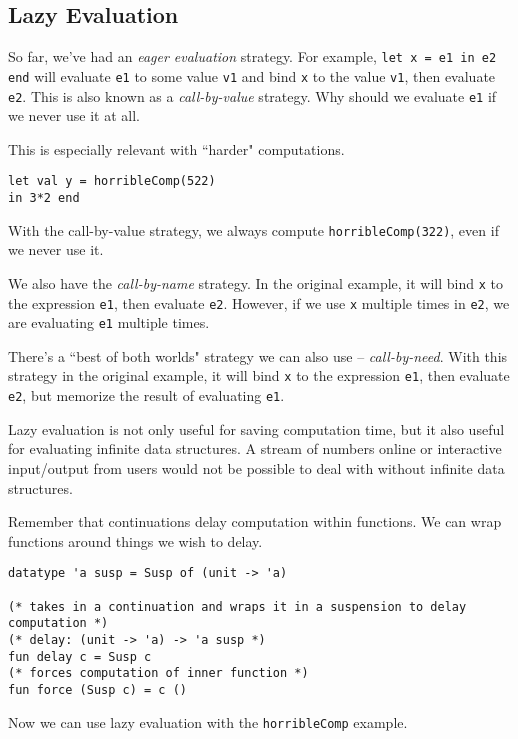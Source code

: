 \documentclass[11pt]{article}
\begin{document}
\subsection{Lazy Evaluation}

So far, we've had an \emph{eager evaluation} strategy. For example, \verb~let x = e1 in e2 end~ will evaluate \verb~e1~ to some value \verb~v1~ and bind \verb~x~ to the value \verb~v1~, then evaluate \verb~e2~. This is also known as a \emph{call-by-value} strategy. Why should we evaluate \verb~e1~ if we never use it at all.

This is especially relevant with ``harder" computations.

\begin{verbatim}
let val y = horribleComp(522)
in 3*2 end
\end{verbatim}

With the call-by-value strategy, we always compute \verb~horribleComp(322)~, even if we never use it.

We also have the \emph{call-by-name} strategy. In the original example, it will bind \verb~x~ to the expression \verb~e1~, then evaluate \verb~e2~. However, if we use \verb~x~ multiple times in \verb~e2~, we are evaluating \verb~e1~ multiple times.

There's a ``best of both worlds" strategy we can also use -- \emph{call-by-need}. With this strategy in the original example, it will bind \verb~x~ to the expression \verb~e1~, then evaluate \verb~e2~, but memorize the result of evaluating \verb~e1~.

Lazy evaluation is not only useful for saving computation time, but it also useful for evaluating infinite data structures. A stream of numbers online or interactive input/output from users would not be possible to deal with without infinite data structures.

Remember that continuations delay computation within functions. We can wrap functions around things we wish to delay.

\begin{verbatim}
datatype 'a susp = Susp of (unit -> 'a)

(* takes in a continuation and wraps it in a suspension to delay computation *)
(* delay: (unit -> 'a) -> 'a susp *)
fun delay c = Susp c
(* forces computation of inner function *)
fun force (Susp c) = c ()
\end{verbatim}

Now we can use lazy evaluation with the \verb~horribleComp~ example.
\end{document}
